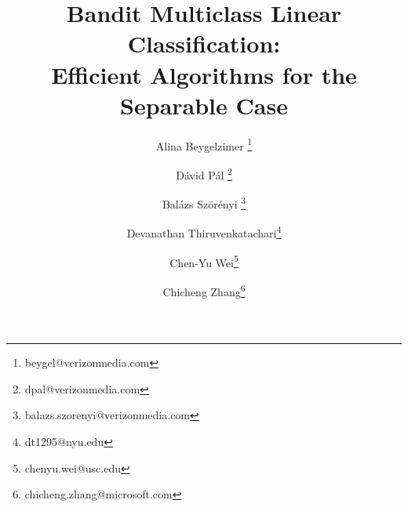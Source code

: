 

\title{Bandit Multiclass Linear Classification: \\ Efficient Algorithms for the Separable Case}

\author[1]{Alina Beygelzimer \thanks{beygel@verizonmedia.com}}
\author[1]{D\'avid P\'al \thanks{dpal@verizonmedia.com}}
\author[1]{Bal\'azs Sz\"or\'enyi \thanks{balazs.szorenyi@verizonmedia.com}}
\author[2]{Devanathan Thiruvenkatachari\thanks{dt1295@nyu.edu}}
\author[3]{Chen-Yu Wei\thanks{chenyu.wei@usc.edu}}
\author[4]{Chicheng Zhang\thanks{chicheng.zhang@microsoft.com}}



\maketitle




